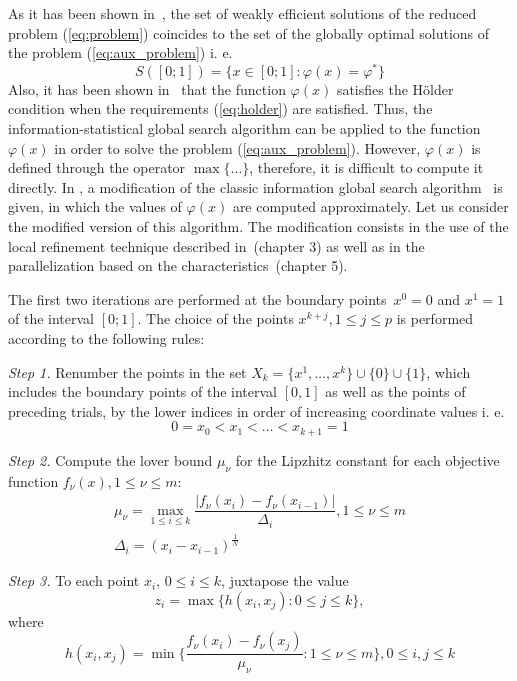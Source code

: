 \documentclass{llncs}
\begin{document}
As it has been shown in~\cite{markinStrongin1993}, the set of weakly efficient solutions of the
reduced problem (\ref{eq:problem}) coincides to the set of the globally optimal solutions of
the problem (\ref{eq:aux_problem}) i. e.
\begin{equation}
  \label{eq:s}
  S([0;1])=\{x\in [0;1]:\varphi(x)=\varphi^*\}
\end{equation}
Also, it has been shown in~\cite{markinStrongin1993} that the function \(\varphi(x)\) satisfies
the H\"older condition when the requirements (\ref{eq:holder}) are satisfied. Thus, the
information-statistical global search algorithm can be applied to the function \(\varphi(x)\) in
order to solve the problem (\ref{eq:aux_problem}). However, \(\varphi(x)\) is defined through
the operator \(\max\{...\}\), therefore, it is difficult to compute it directly. In
\cite{markinStrongin1993}, a modification of the classic information
global search algorithm~\cite{mixedAlg} is given, in which the values of \(\varphi(x)\) are computed
approximately. Let us consider the modified version of this algorithm. The modification
consists in the use of the local refinement technique described in~\cite{strOptBook}(chapter 3)
as well as in the parallelization based on the characteristics~\cite{strOptBook}(chapter 5).

The first two iterations are performed at the boundary points~\(x^0=0\) and \(x^1=1\) of the
interval \([0;1]\). The choice of the points \(x^{k+j}, 1\leqslant j\leqslant p\) is performed
according to the following rules:

\textit{Step 1.} Renumber the points in the set \(X_k=\{x^1,\dotsc,x^k\}\cup\{0\}\cup\{1\}\),
which includes the boundary points of the interval \([0,1]\) as well as the points of preceding
trials, by the lower indices in order of increasing coordinate values  i. e.
\begin{displaymath}
  0=x_0<x_1<\dotsc<x_{k+1}=1
\end{displaymath}

\textit{Step 2.} Compute the lover bound \(\mu_\nu\) for the Lipzhitz constant for each
objective function \(f_\nu(x),1\leqslant\nu\leqslant m\):
\begin{gather}
\label{eq:step2_1}
\mu_\nu=\max_{1\leqslant i\leqslant k}\dfrac{|f_\nu(x_i)-f_\nu(x_{i-1})|}{\Delta_i}, 1\leqslant
\nu\leqslant m \\
\label{eq:step2_2}
\Delta_i=(x_i-x_{i-1})^\frac{1}{N}
\end{gather}

\textit{Step 3.} To each point \(x_i\), \(0\leqslant i\leqslant k\), juxtapose the value
\begin{equation}
  z_i=\max\{h(x_i,x_j):0\leqslant j\leqslant k\},
\end{equation}
where
\begin{equation}
  h(x_i,x_j)=\min\{\frac{f_\nu(x_i)-f_\nu(x_j)}{\mu_\nu}:1\leqslant \nu\leqslant m\}, 0\leqslant
i,j\leqslant k
\end{equation}
\end{document}

